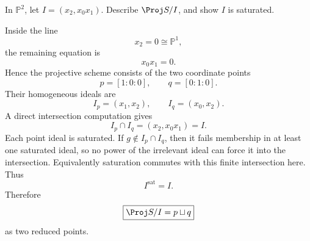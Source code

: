 \begin{problem}\label{prob:vi37-12}
In \(\mathbb P^2\), let \(I=(x_2,x_0x_1)\). Describe \(\Proj S/I\), and show \(I\) is saturated.
\end{problem}

\ifdefined\FullProblemDossiers
\begin{solution}
Inside the line
\[
x_2=0\cong\mathbb P^1,
\]
the remaining equation is
\[
x_0x_1=0.
\]
Hence the projective scheme consists of the two coordinate points
\[
p=[1:0:0],
\qquad
q=[0:1:0].
\]
Their homogeneous ideals are
\[
I_p=(x_1,x_2),
\qquad
I_q=(x_0,x_2).
\]
A direct intersection computation gives
\[
I_p\cap I_q=(x_2,x_0x_1)=I.
\]
Each point ideal is saturated. If \(g\notin I_p\cap I_q\), then it fails membership in at least one saturated ideal, so no power of the irrelevant ideal can force it into the intersection. Equivalently saturation commutes with this finite intersection here. Thus
\[
\boxed{I^{\mathrm{sat}}=I}.
\]
Therefore
\[
\boxed{\Proj S/I=p\sqcup q}
\]
as two reduced points.
\end{solution}
\fi
